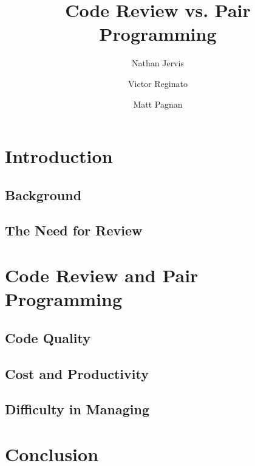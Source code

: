 \documentclass{article}
\title{Code Review vs. Pair Programming}
\author{Nathan Jervis \and Victor Reginato \and Matt Pagnan}
\begin{document}
\maketitle

\section{Introduction}

\subsection{Background}

\subsection{The Need for Review}

\section{Code Review and Pair Programming}

\subsection{Code Quality}

\subsection{Cost and Productivity}

\subsection{Difficulty in Managing}

\section{Conclusion}
\end{document}
